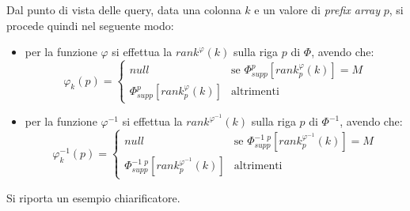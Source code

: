 Dal punto di vista delle query, data una colonna $k$ e un valore di
\textit{prefix array} $p$, si procede quindi nel seguente modo:
\begin{itemize}
  \item per la funzione $\varphi$ si effettua la $rank^\varphi(k)$ sulla riga
  $p$ di $\varPhi$, avendo che:
  \[\varphi_k(p)=
    \begin{cases}
      null&\mbox{se }\varPhi_{supp}^p[rank^\varphi_p(k)]=M\\
      \varPhi_{supp}^p[rank^\varphi_p(k)]&\mbox{altrimenti }
    \end{cases}
  \]
  \item per la funzione $\varphi^{-1}$ si effettua la $rank^{\varphi^{-1}}(k)$
  sulla riga $p$ di $\varPhi^{-1}$, avendo che:
  \[\varphi_k^{-1}(p)=
    \begin{cases}
      null&\mbox{se }\varPhi^{-1\,\,p}_{supp}[rank^{\varphi^{-1}}_p(k)]=M\\
      \varPhi^{-1\,\,p}_{supp}[rank^{\varphi^{-1}}_p(k)]&\mbox{altrimenti }
    \end{cases}
  \]
\end{itemize}
Si riporta un esempio chiarificatore.
